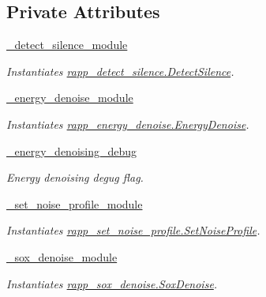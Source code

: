 \subsection*{Private Attributes}
\begin{DoxyCompactItemize}
\item 
\hyperlink{classrapp__audio__processing_1_1rapp__audio__processing_1_1AudioProcessing_a677c0e586ab1b2d3a543791627d0021e}{\-\_\-detect\-\_\-silence\-\_\-module}
\begin{DoxyCompactList}\small\item\em Instantiates \hyperlink{classrapp__audio__processing_1_1rapp__detect__silence_1_1DetectSilence}{rapp\-\_\-detect\-\_\-silence.\-Detect\-Silence}. \end{DoxyCompactList}\item 
\hyperlink{classrapp__audio__processing_1_1rapp__audio__processing_1_1AudioProcessing_a420f9173fcb051d40841bf63146f33af}{\-\_\-energy\-\_\-denoise\-\_\-module}
\begin{DoxyCompactList}\small\item\em Instantiates \hyperlink{classrapp__audio__processing_1_1rapp__energy__denoise_1_1EnergyDenoise}{rapp\-\_\-energy\-\_\-denoise.\-Energy\-Denoise}. \end{DoxyCompactList}\item 
\hyperlink{classrapp__audio__processing_1_1rapp__audio__processing_1_1AudioProcessing_a9ebcd0e63f6fb996af37699a0066f4e4}{\-\_\-energy\-\_\-denoising\-\_\-debug}
\begin{DoxyCompactList}\small\item\em Energy denoising degug flag. \end{DoxyCompactList}\item 
\hyperlink{classrapp__audio__processing_1_1rapp__audio__processing_1_1AudioProcessing_abae6c1bbff4e3fc6b7e295cd01b8508e}{\-\_\-set\-\_\-noise\-\_\-profile\-\_\-module}
\begin{DoxyCompactList}\small\item\em Instantiates \hyperlink{classrapp__audio__processing_1_1rapp__set__noise__profile_1_1SetNoiseProfile}{rapp\-\_\-set\-\_\-noise\-\_\-profile.\-Set\-Noise\-Profile}. \end{DoxyCompactList}\item 
\hyperlink{classrapp__audio__processing_1_1rapp__audio__processing_1_1AudioProcessing_a4a4e243504111ff3396a1fa9647d54ab}{\-\_\-sox\-\_\-denoise\-\_\-module}
\begin{DoxyCompactList}\small\item\em Instantiates \hyperlink{classrapp__audio__processing_1_1rapp__sox__denoise_1_1SoxDenoise}{rapp\-\_\-sox\-\_\-denoise.\-Sox\-Denoise}. \end{DoxyCompactList}\item 

\end{DoxyCompactItemize}

